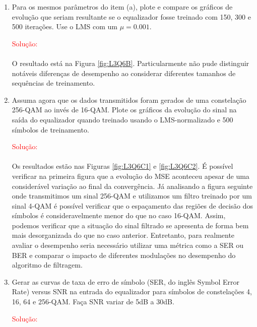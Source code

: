 \documentclass[a4paper,10pt]{article}
\begin{document}
\begin{enumerate}
\begin{enumerate}
					\item Para os mesmos parâmetros do item (a), plote e compare os gráﬁcos de evolução que seriam resultante se o equalizador fosse treinado com 150, 300 e 500 iterações. Use o LMS com um
					$\mu = 0.001$.
					
						\textcolor{red}{Solução:}

						\paragraph{}O resultado está na Figura \ref{fig:L3Q6B}. Particularmente não pude distinguir notáveis diferenças de desempenho ao considerar diferentes tamanhos de sequências de treinamento.

					\item Assuma agora que os dados transmitidos foram gerados de uma constelação 256-QAM ao invés de 16-QAM. Plote os gráﬁcos da evolução do sinal na saída do equalizador quando treinado
					usando o LMS-normalizado e 500 símbolos de treinamento.					
					
						\textcolor{red}{Solução:}

						\paragraph{}Os resultados estão nas Figuras \ref{fig:L3Q6C1} e \ref{fig:L3Q6C2}. É possível verificar na primeira figura que a evolução do MSE aconteceu apesar de uma considerável variação ao final
						da convergência. Já analisando a figura seguinte onde transmitimos um sinal 256-QAM e utilizamos um filtro treinado por um sinal 4-QAM é possível verificar que o espaçamento das regiões de decisão dos 
						símbolos é consideravelmente menor do que no caso 16-QAM. Assim, podemos verificar que a situação do sinal filtrado se apresenta de forma bem mais desorganizada do que no caso anterior. Entretanto, para
						realmente avaliar o desempenho seria necessário utilizar uma métrica como a SER ou BER e comparar o impacto de diferentes modulações no desempenho do algoritmo de filtragem. 

					\item Gerar as curvas de taxa de erro de símbolo (SER, do inglês Symbol Error Rate) versus SNR na entrada do equalizador para símbolos de constelações 4, 16, 64 e 256-QAM. Faça SNR variar
					de 5dB a 30dB.
					
						\textcolor{red}{Solução:}


\end{enumerate}
\end{enumerate}
\end{document}
